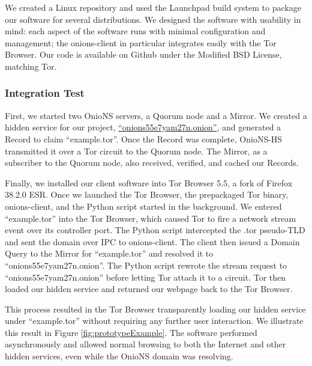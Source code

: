 \documentclass[conference]{IEEEtran}
\begin{document}
We created a Linux repository and used the Launchpad build system to package our software for several distributions. We designed the software with usability in mind: each aspect of the software runs with minimal configuration and management; the onions-client in particular integrates easily with the Tor Browser. Our code is available on Github under the Modified BSD License, matching Tor.

\subsubsection{Integration Test}

First, we started two OnioNS servers, a Quorum node and a Mirror. We created a hidden service for our project, \href{http://onions55e7yam27n.onion}{``onions55e7yam27n.onion''}, and generated a Record to claim ``example.tor''. Once the Record was complete, OnioNS-HS transmitted it over a Tor circuit to the Quorum node. The Mirror, as a subscriber to the Quorum node, also received, verified, and cached our Records.

Finally, we installed our client software into Tor Browser 5.5, a fork of Firefox 38.2.0 ESR. Once we launched the Tor Browser, the prepackaged Tor binary, onions-client, and the Python script started in the background. We entered ``example.tor'' into the Tor Browser, which caused Tor to fire a network stream event over its controller port. The Python script intercepted the .tor pseudo-TLD and sent the domain over IPC to onions-client. The client then issued a Domain Query to the Mirror for ``example.tor'' and resolved it to ``onions55e7yam27n.onion''. The Python script rewrote the stream request to ``onions55e7yam27n.onion'' before letting Tor attach it to a circuit. Tor then loaded our hidden service and returned our webpage back to the Tor Browser.

This process resulted in the Tor Browser transparently loading our hidden service under ``example.tor'' without requiring any further user interaction. We illustrate this result in Figure \ref{fig:prototypeExample}. The software performed asynchronously and allowed normal browsing to both the Internet and other hidden services, even while the OnioNS domain was resolving.

\end{document}
